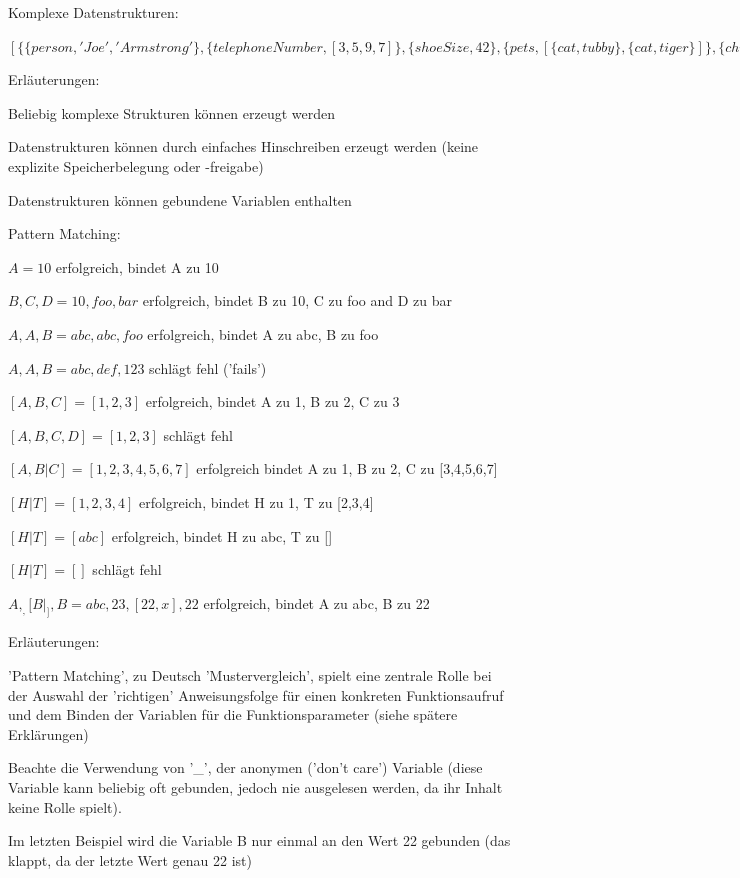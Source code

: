 \documentclass[10pt]{article}
\begin{document}
Komplexe Datenstrukturen:
\begin{itemize*}
  \item $[\{\{person,'Joe', 'Armstrong'\}, \{telephoneNumber, [3,5,9,7]\}, \{shoeSize, 42\}, \{pets, [\{cat, tubby\},\{cat, tiger\}]\}, \{children,[\{thomas, 5\},\{claire,1\}]\}\}, \{\{person,'Mike','Williams'\}, \{shoeSize,41\}, \{likes,[boats, beer]\}, ... \}]$
  \item Erläuterungen:
  \begin{itemize*}
    \item Beliebig komplexe Strukturen können erzeugt werden
    \item Datenstrukturen können durch einfaches Hinschreiben erzeugt werden (keine explizite Speicherbelegung oder -freigabe)
    \item Datenstrukturen können gebundene Variablen enthalten
  \end{itemize*}
\end{itemize*}

Pattern Matching:
\begin{itemize*}
  \item $A = 10$ erfolgreich, bindet A zu 10
  \item ${B, C, D} = {10, foo, bar}$ erfolgreich, bindet B zu 10, C zu foo and D zu bar
  \item ${A, A, B} = {abc, abc, foo}$ erfolgreich, bindet A zu abc, B zu foo
  \item ${A, A, B} = {abc, def, 123}$ schlägt fehl ('fails')
  \item $[A,B,C] = [1,2,3]$ erfolgreich, bindet A zu 1, B zu 2, C zu 3
  \item $[A,B,C,D] = [1,2,3]$ schlägt fehl
  \item $[A,B|C] = [1,2,3,4,5,6,7]$ erfolgreich bindet A zu 1, B zu 2, C zu [3,4,5,6,7]
  \item $[H|T] = [1,2,3,4]$ erfolgreich, bindet H zu 1, T zu [2,3,4]
  \item $[H|T] = [abc]$ erfolgreich, bindet H zu abc, T zu []
  \item $[H|T] = []$ schlägt fehl
  \item ${A,_, [B|_],{B}} = {abc,23,[22,x],{22}}$ erfolgreich, bindet A zu abc, B zu 22
  \item Erläuterungen:
  \begin{itemize*}
    \item 'Pattern Matching', zu Deutsch 'Mustervergleich', spielt eine zentrale Rolle bei der Auswahl der 'richtigen' Anweisungsfolge für einen konkreten Funktionsaufruf und dem Binden der Variablen für die Funktionsparameter (siehe spätere Erklärungen)
    \item Beachte die Verwendung von '\_', der anonymen ('don't care') Variable (diese Variable kann beliebig oft gebunden, jedoch nie ausgelesen werden, da ihr Inhalt keine Rolle spielt).
    \item Im letzten Beispiel wird die Variable B nur einmal an den Wert 22 gebunden (das klappt, da der letzte Wert genau {22} ist)
  \end{itemize*}
\end{itemize*}
\end{document}
